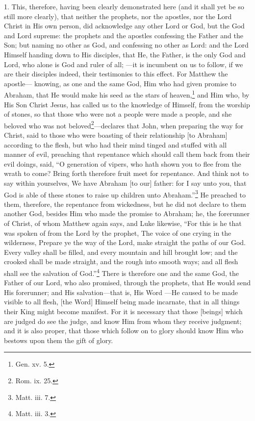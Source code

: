 1. This, therefore, having been clearly demonstrated here (and it shall yet be so still more clearly), that neither the prophets, nor the apostles, nor the Lord Christ in His own person, did acknowledge any other Lord or God, but the God and Lord supreme: the prophets and the apostles confessing the Father and the Son; but naming no other as God, and confessing no other as Lord: and the Lord Himself handing down to His disciples, that He, the Father, is the only God and Lord, who alone is God and ruler of all; —it is incumbent on us to follow, if we are their disciples indeed, their testimonies to this effect. For Matthew the apostle— knowing, as one and the same God, Him who had given promise to Abraham, that He would make his seed as the stars of heaven,\footnote{Gen. xv. 5.} and Him who, by His Son Christ Jesus, has called us to the knowledge of Himself, from the worship of stones, so that those who were not a people were made a people, and she beloved who was not beloved\footnote{Rom. ix. 25.}—declares that John, when preparing the way for Christ, said to those who were boasting of their relationship [to Abraham] according to the flesh, but who had their mind tinged and stuffed with all manner of evil, preaching that repentance which should call them back from their evil doings, said, “O generation of vipers, who hath shown you to flee from the wrath to come? Bring forth therefore fruit meet for repentance. And think not to say within yourselves, We have Abraham [to our] father: for I say unto you, that God is able of these stones to raise up children unto Abraham.”\footnote{Matt. iii. 7.} He preached to them, therefore, the repentance from wickedness, but he did not declare to them another God, besides Him who made the promise to Abraham; he, the forerunner of Christ, of whom Matthew again says, and Luke likewise, “For this is he that was spoken of from the Lord by the prophet, The voice of one crying in the wilderness, Prepare ye the way of the Lord, make straight the paths of our God. Every valley shall be filled, and every mountain and hill brought low; and the crooked shall be made straight, and the rough into smooth ways; and all flesh shall see the salvation of God.”\footnote{Matt. iii. 3.} There is therefore one and the same God, the Father of our Lord, who also promised, through the prophets, that He would send His forerunner; and His salvation—that is, His Word —He caused to be made visible to all flesh, [the Word] Himself being made incarnate, that in all things their King might become manifest. For it is necessary that those [beings] which are judged do see the judge, and know Him from whom they receive judgment; and it is also proper, that those which follow on to glory should know Him who bestows upon them the gift of glory.

